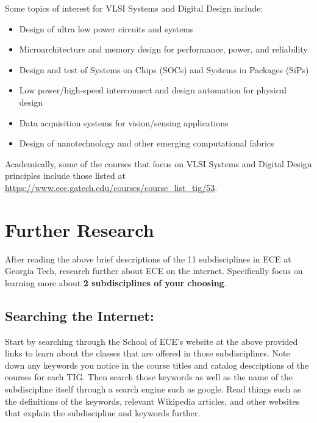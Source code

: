 \documentclass[12pt]{article}
\begin{document}
Some topics of interest for VLSI Systems and Digital Design include:

\begin{itemize}
    \item Design of ultra low power circuits and systems
    \item Microarchitecture and memory design for performance, power, and reliability
    \item Design and test of Systems on Chips (SOCs) and Systems in Packages (SiPs)
    \item Low power/high-speed interconnect and design automation for physical design
    \item Data acquisition systems for vision/sensing applications
    \item Design of nanotechnology and other emerging computational fabrics
\end{itemize}

Academically, some of the courses that focus on VLSI Systems and Digital Design principles include those listed at \url{https://www.ece.gatech.edu/courses/course_list_tig/53}.

\section{Further Research}
After reading the above brief descriptions of the 11 subdisciplines in ECE at Georgia Tech, research further about ECE on the internet. Specifically focus on learning more about \textbf{2 subdisciplines of your choosing}. 

\subsection{Searching the Internet:}
Start by searching through the School of ECE's website at the above provided links to learn about the classes that are offered in those subdisciplines. Note down any keywords you notice in the course titles and catalog descriptions of the courses for each TIG. Then search those keywords as well as the name of the subdiscipline itself through a search engine such as google. Read things such as the definitions of the keywords, relevant Wikipedia articles, and other websites that explain the subdiscipline and keywords further.  
\end{document}
